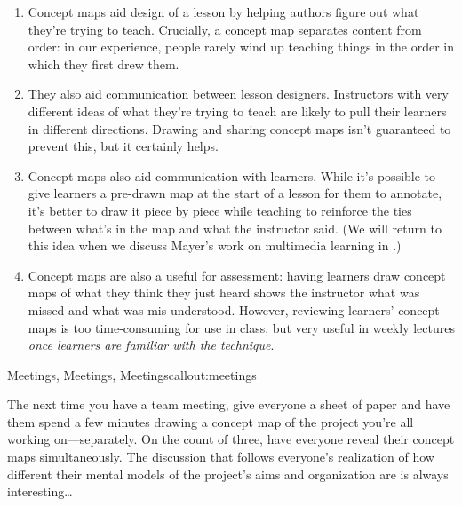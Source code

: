 \begin{enumerate}

\item
  Concept maps aid design of a lesson by helping authors figure out
  what they're trying to teach. Crucially, a concept map separates
  content from order: in our experience, people rarely wind up
  teaching things in the order in which they first drew them.

\item
  They also aid communication between lesson designers. Instructors
  with very different ideas of what they're trying to teach are likely
  to pull their learners in different directions. Drawing and sharing
  concept maps isn't guaranteed to prevent this, but it certainly
  helps.

\item
  Concept maps also aid communication with learners. While it's
  possible to give learners a pre-drawn map at the start of a lesson
  for them to annotate, it's better to draw it piece by piece while
  teaching to reinforce the ties between what's in the map and what
  the instructor said. (We will return to this idea when we discuss
  Mayer's work on multimedia learning in .)

\item
  Concept maps are also a useful for assessment: having learners draw
  concept maps of what they think they just heard shows the instructor
  what was missed and what was mis-understood.  However, reviewing
  learners' concept maps is too time-consuming for use in class, but
  very useful in weekly lectures \emph{once learners are familiar with
  the technique}. 

\end{enumerate}

\begin{callout}{Meetings, Meetings, Meetings}{callout:meetings}

The next time you have a team meeting, give everyone a sheet of paper
and have them spend a few minutes drawing a concept map of the project
you're all working on---separately. On the count of three, have
everyone reveal their concept maps simultaneously. The discussion that
follows everyone's realization of how different their mental models of
the project's aims and organization are is always interesting{\ldots}

\end{callout}


